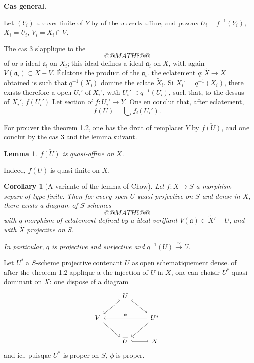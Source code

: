 \documentclass[11pt,a4paper]{article}
\theoremstyle{plain}
\newtheorem{lemma}[theorem]{Lemma}
\newtheorem{corollary}[theorem]{Corollary}
\theoremstyle{definition}
\begin{document}
\smallskip
\noindent\textbf{Cas general.}

Let $(Y_i)$ a cover finite of $Y$ by of the ouverts affine, and posons $U_i = f^{-1}(Y_i)$, $X_i = \overline{U}_i$, $V_i = X_i \cap V$.

The cas 3 s'applique to the
\[
@@MATH8@@
\]
of or a ideal $\mathfrak{a}_i$ on $X_i$; this ideal defines a ideal $\mathfrak{a}_i$ on $X$, with again $V(\mathfrak{a}_i) \subset X - V$. \'Eclatons the product of the $\mathfrak{a}_i$. the eclatement $q: \widetilde{X} \to X$ obtained is such that $q^{-1}(X_i)$ domine the eclate $\widetilde{X}_i$. Si $X_i' = q^{-1}(X_i)$, there exists therefore a open $U_i'$ of $X_i'$, with $U_i' \supset q^{-1}(U_i)$, such that, to the-dessus of $X_i'$, $f(U_i')$ Let section of $f: U_i' \to Y$. One en conclut that, after eclatement,
\[
f(U) = \bigcup f_i(U_i').
\]

For prouver the theorem 1.2, one has the droit of remplacer $Y$ by $\overline{f(U)}$, and one conclut by the cas 3 and the lemma suivant.

\begin{lemma}
$\overline{f(U)}$ is quasi-affine on $X$.
\end{lemma}

Indeed, $\overline{f(U)}$ is quasi-finite on $X$.

\begin{corollary}[A variante of the lemma of Chow]
Let $f: X \to S$ a morphism separe of type finite. Then for every open $U$ quasi-projective on $S$ and dense in $X$, there exists a diagram of $S$-schemes
\[
@@MATH9@@
\]
with $q$ morphism of eclatement defined by a ideal verifiant $V(\mathfrak{a}) \subset \widetilde{X}' - U$, and with $\widetilde{X}$ projective on $S$.

In particular, $q$ is projective and surjective and $q^{-1}(U) \xrightarrow{\sim} U$.
\end{corollary}

Let $U^*$ a $S$-scheme projective contenant $U$ as open schematiquement dense. of after the theorem 1.2 applique a the injection of $U$ in $X$, one can choisir $U^*$ quasi-dominant on $X$: one dispose of a diagram
\begin{equation}\label{eq:1.4.1}
\begin{tikzcd}
& U \arrow[dl, hook'] \arrow[dr, hook] \\
V \arrow[dr] & & U^* \arrow[ll, "\phi"'] \arrow[dl] \\
& \overline{U} \arrow[r, hook] & X
\end{tikzcd}
\end{equation}
and ici, puisque $U^*$ is proper on $S$, $\phi$ is proper.
\end{document}
